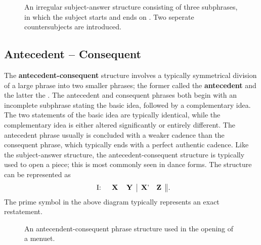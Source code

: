 \begin{figure}[h]
\centering
{}
\caption{An irregular subject-answer structure consisting of three subphrases, in which the subject starts and ends on . Two seperate countersubjects are introduced. }
\end{figure}

\subsection{Antecedent -- Consequent}

The \textbf{antecedent-consequent} structure involves a typically symmetrical division of a large phrase into two smaller phrases; the former called the \textbf{antecedent} and the latter the . The antecedent and consequent phrases both begin with an incomplete subphrase stating the basic idea, followed by a complementary idea. The two statements of the basic idea are typically identical, while the complementary idea is either altered significantly or entirely different. The antecedent phrase usually is concluded with a weaker cadence than the consequent phrase, which typically ends with a perfect authentic cadence. Like the subject-answer structure, the antecedent-consequent structure is typically used to open a piece; this is most commonly seen in dance forms. The structure can be represented as
\begin{equation*}\label{fig:antecedent_consequent}
\begin{tabular}{rcc|cc||}
I: \quad & \textbf{X} & \textbf{Y} & \textbf{X}'\! & \textbf{Z}
\end{tabular} \, .
\end{equation*}
The prime symbol in the above diagram typically represents an exact restatement.

\begin{figure}
  \hspace{-5pt}
  \caption{An antecendent-consequent phrase structure used in the opening of a menuet. }
\end{figure}

